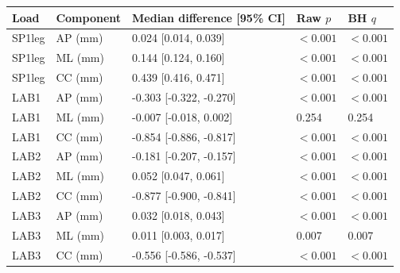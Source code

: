 \begin{tabular}{lllll}
\toprule
Load & Component & Median difference [95\% CI] & Raw $p$ & BH $q$ \\
\midrule
SP1leg & AP (mm) & 0.024 [0.014, 0.039] & $<0.001$ & $<0.001$ \\
SP1leg & ML (mm) & 0.144 [0.124, 0.160] & $<0.001$ & $<0.001$ \\
SP1leg & CC (mm) & 0.439 [0.416, 0.471] & $<0.001$ & $<0.001$ \\
LAB1 & AP (mm) & -0.303 [-0.322, -0.270] & $<0.001$ & $<0.001$ \\
LAB1 & ML (mm) & -0.007 [-0.018, 0.002] & 0.254 & 0.254 \\
LAB1 & CC (mm) & -0.854 [-0.886, -0.817] & $<0.001$ & $<0.001$ \\
LAB2 & AP (mm) & -0.181 [-0.207, -0.157] & $<0.001$ & $<0.001$ \\
LAB2 & ML (mm) & 0.052 [0.047, 0.061] & $<0.001$ & $<0.001$ \\
LAB2 & CC (mm) & -0.877 [-0.900, -0.841] & $<0.001$ & $<0.001$ \\
LAB3 & AP (mm) & 0.032 [0.018, 0.043] & $<0.001$ & $<0.001$ \\
LAB3 & ML (mm) & 0.011 [0.003, 0.017] & 0.007 & 0.007 \\
LAB3 & CC (mm) & -0.556 [-0.586, -0.537] & $<0.001$ & $<0.001$ \\
\bottomrule
\end{tabular}
